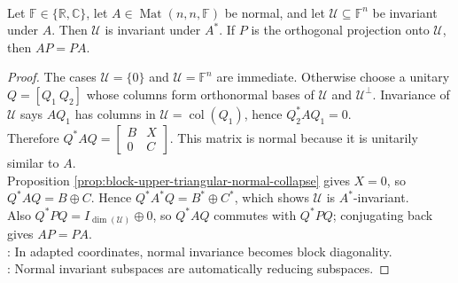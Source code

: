 \begin{theorem} \label{thm:normal-invariant-subspaces-reduce} \\
Let $\mathbb{F}\in\{\mathbb{R},\mathbb{C}\}$, let $A\in\operatorname{Mat}(n,n,\mathbb{F})$ be normal, and let $\mathcal{U}\subseteq\mathbb{F}^n$ be invariant under $A$. Then $\mathcal{U}$ is invariant under $A^*$. If $P$ is the orthogonal projection onto $\mathcal{U}$, then $AP=PA$.
\begin{proof}
The cases $\mathcal{U}=\{0\}$ and $\mathcal{U}=\mathbb{F}^n$ are immediate. Otherwise choose a unitary $Q=[Q_1\ Q_2]$ whose columns form orthonormal bases of $\mathcal{U}$ and $\mathcal{U}^{\perp}$. Invariance of $\mathcal{U}$ says $AQ_1$ has columns in $\mathcal{U}=\operatorname{col}(Q_1)$, hence $Q_2^*AQ_1=0$.\\
Therefore $Q^*AQ=
\begin{bmatrix}
B&X\\
0&C
\end{bmatrix}$. This matrix is normal because it is unitarily similar to $A$.\\
Proposition \ref{prop:block-upper-triangular-normal-collapse} gives $X=0$, so $Q^*AQ=B\oplus C$. Hence $Q^*A^*Q=B^*\oplus C^*$, which shows $\mathcal{U}$ is $A^*$-invariant.\\
Also $Q^*PQ=I_{\dim(\mathcal{U})}\oplus0$, so $Q^*AQ$ commutes with $Q^*PQ$; conjugating back gives $AP=PA$.\\
: In adapted coordinates, normal invariance becomes block diagonality.\\
: Normal invariant subspaces are automatically reducing subspaces.
\end{proof}
\end{theorem}

